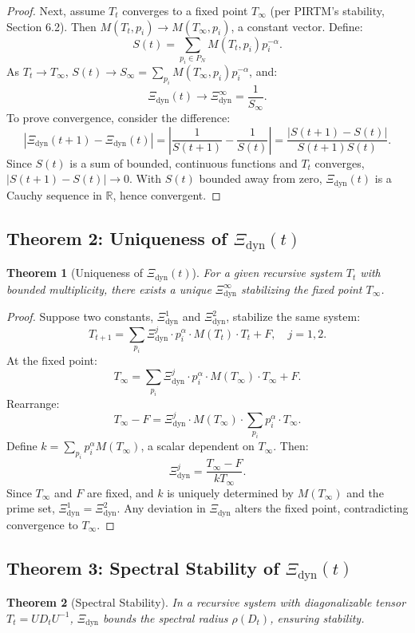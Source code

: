 \documentclass{article}
\theoremstyle{plain}
\newtheorem{theorem}{Theorem}
\begin{document}
\begin{itemize}
\begin{proof}
Next, assume \( T_t \) converges to a fixed point \( T_\infty \) (per PIRTM’s stability, Section 6.2). Then \( M(T_t, p_i) \to M(T_\infty, p_i) \), a constant vector. Define:
\[
S(t) = \sum_{p_i \in P_N} M(T_t, p_i) p_i^{-\alpha}.
\]
As \( T_t \to T_\infty \), \( S(t) \to S_\infty = \sum_{p_i} M(T_\infty, p_i) p_i^{-\alpha} \), and:
\[
\Xi_{\text{dyn}}(t) \to \Xi_{\text{dyn}}^\infty = \frac{1}{S_\infty}.
\]
To prove convergence, consider the difference:
\[
|\Xi_{\text{dyn}}(t+1) - \Xi_{\text{dyn}}(t)| = \left| \frac{1}{S(t+1)} - \frac{1}{S(t)} \right| = \frac{|S(t+1) - S(t)|}{S(t+1) S(t)}.
\]
Since \( S(t) \) is a sum of bounded, continuous functions and \( T_t \) converges, \( |S(t+1) - S(t)| \to 0 \). With \( S(t) \) bounded away from zero, $\Xi_{\text{dyn}}(t)$ is a Cauchy sequence in \(\mathbb{R}\), hence convergent.
\end{proof}

\subsection{Theorem 2: Uniqueness of $\Xi_{\text{dyn}}(t)$}
\begin{theorem}[Uniqueness of $\Xi_{\text{dyn}}(t)$]
For a given recursive system \( T_t \) with bounded multiplicity, there exists a unique $\Xi_{\text{dyn}}^\infty$ stabilizing the fixed point \( T_\infty \).
\end{theorem}

\begin{proof}
Suppose two constants, $\Xi_{\text{dyn}}^1$ and $\Xi_{\text{dyn}}^2$, stabilize the same system:
\[
T_{t+1} = \sum_{p_i} \Xi_{\text{dyn}}^j \cdot p_i^\alpha \cdot M(T_t) \cdot T_t + F, \quad j = 1, 2.
\]
At the fixed point:
\[
T_\infty = \sum_{p_i} \Xi_{\text{dyn}}^j \cdot p_i^\alpha \cdot M(T_\infty) \cdot T_\infty + F.
\]
Rearrange:
\[
T_\infty - F = \Xi_{\text{dyn}}^j \cdot M(T_\infty) \cdot \sum_{p_i} p_i^\alpha \cdot T_\infty.
\]
Define \( k = \sum_{p_i} p_i^\alpha M(T_\infty) \), a scalar dependent on \( T_\infty \). Then:
\[
\Xi_{\text{dyn}}^j = \frac{T_\infty - F}{k T_\infty}.
\]
Since \( T_\infty \) and \( F \) are fixed, and \( k \) is uniquely determined by \( M(T_\infty) \) and the prime set, $\Xi_{\text{dyn}}^1 = \Xi_{\text{dyn}}^2$. Any deviation in $\Xi_{\text{dyn}}$ alters the fixed point, contradicting convergence to \( T_\infty \).
\end{proof}

\subsection{Theorem 3: Spectral Stability of $\Xi_{\text{dyn}}(t)$}
\begin{theorem}[Spectral Stability]
In a recursive system with diagonalizable tensor \( T_t = U D_t U^{-1} \), $\Xi_{\text{dyn}}$ bounds the spectral radius $\rho(D_t)$, ensuring stability.
\end{theorem}


\end{itemize}
\end{document}
